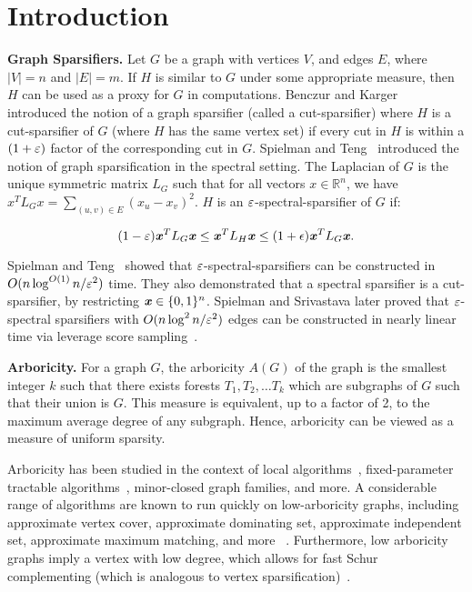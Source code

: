 \section{Introduction}

\textbf{Graph Sparsifiers.} 
Let $G$ be a graph with vertices $V$, and
edges $E$, where $|V| = n$ and $|E| = m$. If $H$ is similar to $G$ under
some appropriate measure, then $H$ can be used as a proxy for $G$ in
computations. Benczur and Karger~\cite{BenczurK96} introduced the notion of a
graph sparsifier (called a cut-sparsifier) where $H$ is a cut-sparsifier
of $G$ (where $H$ has the same vertex set) if every cut in $H$ is within a $(1+\varepsilon)$
factor of the corresponding cut in $G$. 
Spielman and Teng~\cite{SpielmanT04}
introduced the notion of graph sparsification in the spectral setting.
The Laplacian of $G$ is the unique symmetric matrix $L_G$ such that for
all vectors $x \in \mathbb{R}^n$, we have $x^T L_G x = \sum_{(u,v) \in
E} (x_u - x_v)^2$. $H$ is an $\varepsilon$-spectral-sparsifier of $G$ if:

\begin{equation}\label{1}
  (1-\varepsilon) \boldsymbol{\mathit{x}}^TL_G\boldsymbol{\mathit{x}} \leq \boldsymbol{\mathit{x}}^TL_H\boldsymbol{\mathit{x}} \leq (1+\epsilon)\boldsymbol{\mathit{x}}^TL_G\boldsymbol{\mathit{x}}.
\end{equation}

Spielman and Teng~\cite{SpielmanT04} showed that $\varepsilon$-spectral-sparsifiers
can be constructed in
\\
$O(n \log^{O(1)} n / \varepsilon^2)$ time. They also
demonstrated that a spectral sparsifier is a cut-sparsifier, by
restricting $\boldsymbol{\mathit{x}} \in \{0, 1\}^n$.  Spielman and Srivastava later proved
that $\varepsilon$-spectral sparsifiers with $O(n \log^2 n / \varepsilon^2)$ edges can be
constructed in nearly linear time via leverage score sampling~\cite{SpielmanS08}.

\textbf{Arboricity.} For a graph $G$, the arboricity $A(G)$ of the graph
is the smallest integer $k$ such that there exists forests $T_1, T_2,
\ldots T_k$ which are subgraphs of $G$ such that their union is $G$.
This measure is equivalent, up to a factor of 2, to the maximum average
degree of any subgraph. Hence, arboricity can be viewed as a measure of
uniform sparsity.

Arboricity has been studied in the context of local
algorithms~\cite{Solomon18}, fixed-parameter
tractable algorithms~\cite{LinSS12, Solomon18}, minor-closed graph
families, and more. A considerable range of algorithms are known to run quickly
on low-arboricity graphs, including approximate vertex cover,
approximate dominating set, approximate independent set, approximate
maximum matching, and more ~\cite{Solomon18, Suomeloa12, KuhnW05, LinSS12, GoelG06}. Furthermore, low arboricity graphs imply a
vertex with low degree, which allows for fast Schur complementing (which
is analogous to vertex sparsification)~\cite{AbrahamDKKP16}.

